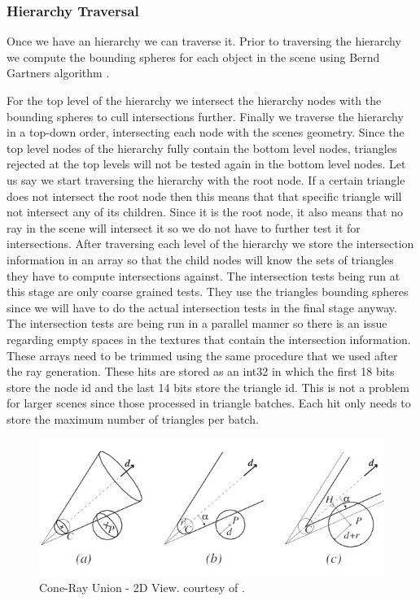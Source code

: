 \documentclass{egpubl}
\begin{document}
\subsubsection{Hierarchy Traversal}

Once we have an hierarchy we can traverse it. Prior to traversing the hierarchy we compute the bounding spheres for each object in the scene using Bernd Gartners algorithm \cite{Gartner99}.

For the top level of the hierarchy we intersect the hierarchy nodes with the bounding spheres to cull intersections further. Finally we traverse the hierarchy in a top-down order, intersecting each node with the scenes geometry. Since the top level nodes of the hierarchy fully contain the bottom level nodes, triangles rejected at the top levels will not be tested again in the bottom level nodes. Let us say we start traversing the hierarchy with the root node. If a certain triangle does not intersect the root node then this means that that specific triangle will not intersect any of its children. Since it is the root node, it also means that no ray in the scene will intersect it so we do not have to further test it for intersections. After traversing each level of the hierarchy we store the intersection information in an array so that the child nodes will know the sets of triangles they have to compute intersections against. The intersection tests being run at this stage are only coarse grained tests. They use the triangles bounding spheres since we will have to do the actual intersection tests in the final stage anyway. The intersection tests are being run in a parallel manner so there is an issue regarding empty spaces in the textures that contain the intersection information. These arrays need to be trimmed using the same procedure that we used after the ray generation. These hits are stored as an int32 in which the first 18 bits store the node id and the last 14 bits store the triangle id. This is not a problem for larger scenes since those processed in triangle batches. Each hit only needs to store the maximum number of triangles per batch.

\begin{figure}[!htb]
    \centering
    \includegraphics[scale=0.50]{images/node-sphere-intersection.jpg}
    \caption{\label{fig:crud2}Cone-Ray Union - 2D View. \small courtesy of \cite{Roger07}.}
\end{figure}
\end{document}
